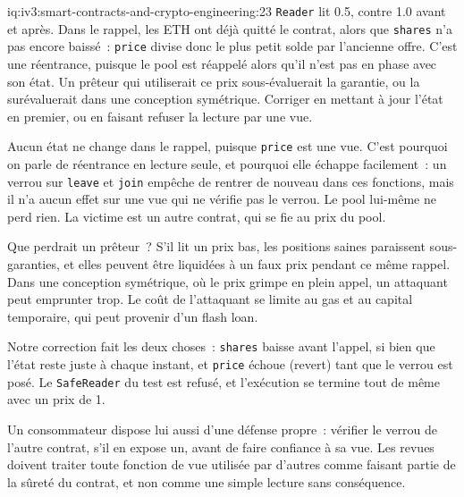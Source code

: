 \begin{solution}{iq:iv3:smart-contracts-and-crypto-engineering:23}
\texttt{Reader} lit 0.5, contre 1.0 avant et après. Dans le rappel, les ETH ont déjà quitté le contrat, alors que \texttt{shares} n'a pas encore baissé~: \texttt{price} divise donc le plus petit solde par l'ancienne offre. C'est une réentrance, puisque le pool est réappelé alors qu'il n'est pas en phase avec son état. Un prêteur qui utiliserait ce prix sous-évaluerait la garantie, ou la surévaluerait dans une conception symétrique. Corriger en mettant à jour l'état en premier, ou en faisant refuser la lecture par une vue.

Aucun état ne change dans le rappel, puisque \texttt{price} est une vue. C'est pourquoi on parle de réentrance en lecture seule, et pourquoi elle échappe facilement~: un verrou sur \texttt{leave} et \texttt{join} empêche de rentrer de nouveau dans ces fonctions, mais il n'a aucun effet sur une vue qui ne vérifie pas le verrou. Le pool lui-même ne perd rien. La victime est un autre contrat, qui se fie au prix du pool.

Que perdrait un prêteur~? S'il lit un prix bas, les positions saines paraissent sous-garanties, et elles peuvent être liquidées à un faux prix pendant ce même rappel. Dans une conception symétrique, où le prix grimpe en plein appel, un attaquant peut emprunter trop. Le coût de l'attaquant se limite au gas et au capital temporaire, qui peut provenir d'un flash loan.

Notre correction fait les deux choses~: \texttt{shares} baisse avant l'appel, si bien que l'état reste juste à chaque instant, et \texttt{price} échoue (revert) tant que le verrou est posé. Le \texttt{SafeReader} du test est refusé, et l'exécution se termine tout de même avec un prix de 1.

Un consommateur dispose lui aussi d'une défense propre~: vérifier le verrou de l'autre contrat, s'il en expose un, avant de faire confiance à sa vue. Les revues doivent traiter toute fonction de vue utilisée par d'autres comme faisant partie de la sûreté du contrat, et non comme une simple lecture sans conséquence.

\end{solution}


